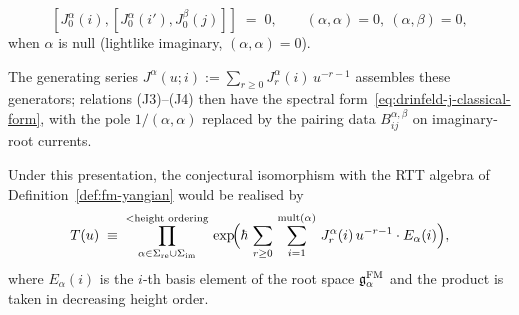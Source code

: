 \begin{conjecture}
\begin{enumerate}[label=\textup{(J\arabic*)}]
\[
 [J^\alpha_0(i), [J^\alpha_0(i'), J^\beta_0(j)]] \;=\; 0, \qquad (\alpha, \alpha) = 0,\ (\alpha, \beta) = 0,
\]
when $\alpha$ is null (lightlike imaginary, $(\alpha, \alpha) = 0$).
\end{enumerate}
The generating series $J^\alpha(u; i) := \sum_{r \geq 0} J^\alpha_r(i)\, u^{-r-1}$ assembles these generators; relations \textup{(J3)}--\textup{(J4)} then have the spectral form~\eqref{eq:drinfeld-j-classical-form}, with the pole $1/(\alpha, \alpha)$ replaced by the pairing data $B^{\alpha, \beta}_{ij}$ on imaginary-root currents.

Under this presentation, the conjectural isomorphism with the RTT algebra
of Definition~\ref{def:fm-yangian} would be realised by
\[
 T(u) \;\equiv\; \prod_{\alpha \in \Sigma_{\mathrm{re}} \cup \Sigma_{\mathrm{im}}}^{<\text{height ordering}}\, \exp\!\Bigl( \hbar\, \sum_{r \geq 0}\, \sum_{i=1}^{\mathrm{mult}(\alpha)}\, J^\alpha_r(i)\, u^{-r-1} \cdot E_\alpha(i) \Bigr),
\]
where $E_\alpha(i)$ is the $i$-th basis element of the root space $\mathfrak{g}^{\mathrm{FM}}_\alpha$ and the product is taken in decreasing height order.
\end{conjecture}

